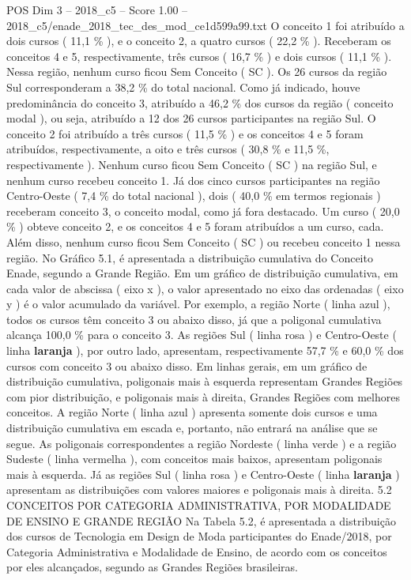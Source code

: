 \begin{textsample}{POS Dim 3 – 2018\_c5 – Score 1.00 – 2018\_c5/enade\_2018\_tec\_des\_mod\_ce1d599a99.txt}
O conceito 1 foi atribuído a dois cursos ( 11,1 \% ), e o conceito 2, a quatro cursos ( 22,2 \% ).
Receberam os conceitos 4 e 5, respectivamente, três cursos ( 16,7 \% ) e dois cursos ( 11,1 \% ).
Nessa região, nenhum curso ficou Sem Conceito ( SC ).
Os 26 cursos da região Sul corresponderam a 38,2 \% do total nacional.
Como já indicado, houve predominância do conceito 3, atribuído a 46,2 \% dos cursos da região ( conceito modal ), ou seja, atribuído a 12 dos 26 cursos participantes na região Sul.
O conceito 2 foi atribuído a três cursos ( 11,5 \% ) e os conceitos 4 e 5 foram atribuídos, respectivamente, a oito e três cursos ( 30,8 \% e 11,5 \%, respectivamente ).
Nenhum curso ficou Sem Conceito ( SC ) na região Sul, e nenhum curso recebeu conceito 1.
Já dos cinco cursos participantes na região Centro-Oeste ( 7,4 \% do total nacional ), dois ( 40,0 \% em termos regionais ) receberam conceito 3, o conceito modal, como já fora destacado.
Um curso ( 20,0 \% ) obteve conceito 2, e os conceitos 4 e 5 foram atribuídos a um curso, cada.
Além disso, nenhum curso ficou Sem Conceito ( SC ) ou recebeu conceito 1 nessa região.
No Gráfico 5.1, é apresentada a distribuição cumulativa do Conceito Enade, segundo a Grande Região.
Em um gráfico de distribuição cumulativa, em cada valor de abscissa ( eixo x ), o valor apresentado no eixo das ordenadas ( eixo y ) é o valor acumulado da variável.
Por exemplo, a região Norte ( linha azul ), todos os cursos têm conceito 3 ou abaixo disso, já que a poligonal cumulativa alcança 100,0 \% para o conceito 3.
As regiões Sul ( linha rosa ) e Centro-Oeste ( linha \textbf{laranja} ), por outro lado, apresentam, respectivamente 57,7 \% e 60,0 \% dos cursos com conceito 3 ou abaixo disso.
Em linhas gerais, em um gráfico de distribuição cumulativa, poligonais mais à esquerda representam Grandes Regiões com pior distribuição, e poligonais mais à direita, Grandes Regiões com melhores conceitos.
A região Norte ( linha azul ) apresenta somente dois cursos e uma distribuição cumulativa em escada e, portanto, não entrará na análise que se segue.
As poligonais correspondentes a região Nordeste ( linha verde ) e a região Sudeste ( linha vermelha ), com conceitos mais baixos, apresentam poligonais mais à esquerda.
Já as regiões Sul ( linha rosa ) e Centro-Oeste ( linha \textbf{laranja} ) apresentam as distribuições com valores maiores e poligonais mais à direita. 5.2 CONCEITOS POR CATEGORIA ADMINISTRATIVA, POR MODALIDADE DE ENSINO E GRANDE REGIÃO Na Tabela 5.2, é apresentada a distribuição dos cursos de Tecnologia em Design de Moda participantes do Enade/2018, por Categoria Administrativa e Modalidade de Ensino, de acordo com os conceitos por eles alcançados, segundo as Grandes Regiões brasileiras.

\end{textsample}
